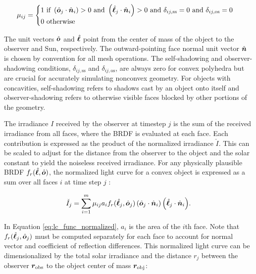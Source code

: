 \begin{equation} \label{eq:cvx_shadow_cond}
  \mu_{ij} = \begin{cases}
    1 \text{ if } \left( \hat{\bm{o}}_j \cdot \hat{\bm{n}}_i \right) > 0 \text{ and } \left( \hat{\bm{\ell}}_j \cdot \hat{\bm{n}}_i \right) > 0 
	  \text{ and } \delta_{ij,\text{ss}} = 0 \text{ and } \delta_{ij,\text{os}} = 0\\
    0 \text{ otherwise } \\
  \end{cases}
\end{equation}

The unit vectors $\hat{\bm{o}}$ and $\hat{\bm{\ell}}$ point from the center of mass of the object to the observer and Sun, respectively. The outward-pointing face normal unit vector $\hat{\bm{n}}$ is chosen by convention for all mesh operations. The self-shadowing and observer-shadowing conditions, $\delta_{ij,\text{ss}}$ and $\delta_{ij,\text{os}}$, are always zero for convex polyhedra but are crucial for accurately simulating nonconvex geometry. For objects with concavities, self-shadowing refers to shadows cast by an object onto itself and observer-shadowing refers to otherwise visible faces blocked by other portions of the geometry.

The irradiance $I$ received by the observer at timestep $j$ is the sum of the received irradiance from all faces, where the BRDF is evaluated at each face. Each contribution is expressed as the product of the
normalized irradiance $\check{I}$. This can be scaled to adjust for the distance from the observer to
the object and the solar constant to yield the noiseless received irradiance. For any physically plausible BRDF $f_r(\hat{\bm{\ell}}, \hat{\bm{o}})$, the normalized light curve for a convex object is expressed as a sum over all faces $i$ at time step $j$ \cite{fan2020thesis}:

\begin{equation} \label{eq:lc_func_normalized}
  \check{I}_{j} = \sum_{i=1}^{m}{\mu_{ij} a_i f_r(\hat{\bm{\ell}}_j, \hat{\bm{o}}_j) \left( \hat{\bm{o}}_j \cdot \hat{\bm{n}}_i \right) \left( \hat{\bm{\ell}}_j \cdot \hat{\bm{n}}_i \right)}.
\end{equation}

In Equation \ref{eq:lc_func_normalized}, $a_i$ is the area of the $i$th face. Note that $f_r(\hat{\bm{\ell}}_j, \hat{\bm{o}}_j)$ must be computed separately for each face to account for normal vector and coefficient of reflection differences. This normalized light curve can be dimensionalized by the total solar irradiance and the distance $r_j$ between the observer $\bm{r}_\mathrm{obs}$ to the object center of mass $\bm{r}_\mathrm{obj}$:

